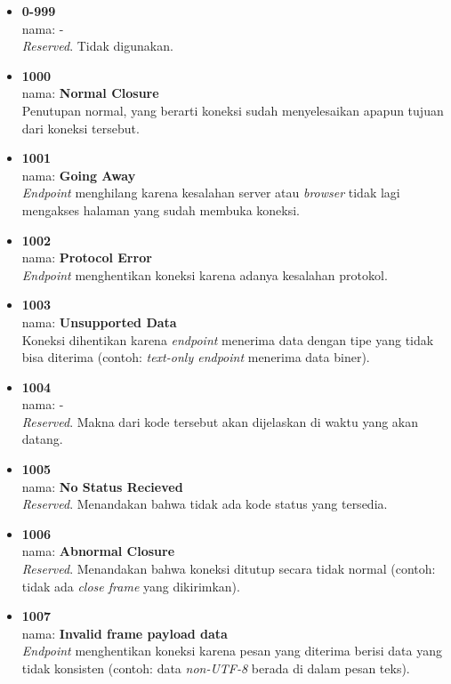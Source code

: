 \begin{itemize}
	\item \textbf{0-999} \\ nama: - \\ \textit{Reserved}. Tidak digunakan.
	
	\item \textbf{1000} \\ nama: \textbf{Normal Closure} \\ Penutupan normal, yang berarti koneksi sudah menyelesaikan apapun tujuan dari koneksi tersebut.
	
	\item \textbf{1001} \\ nama: \textbf{Going Away} \\ \textit{Endpoint} menghilang karena kesalahan server atau \textit{browser} tidak lagi mengakses halaman yang sudah membuka koneksi.
	
	\item \textbf{1002} \\ nama: \textbf{Protocol Error} \\ \textit{Endpoint} menghentikan koneksi karena adanya kesalahan protokol.
	
	\item \textbf{1003} \\ nama: \textbf{Unsupported Data} \\ Koneksi dihentikan karena \textit{endpoint} menerima data dengan tipe yang tidak bisa diterima (contoh: \textit{text-only endpoint} menerima data biner).
	
	\item \textbf{1004} \\ nama: - \\ \textit{Reserved}. Makna dari kode tersebut akan dijelaskan di waktu yang akan datang.
	
	\item \textbf{1005} \\ nama: \textbf{No Status Recieved} \\ \textit{Reserved}. Menandakan bahwa tidak ada kode status yang tersedia.
	
	\item \textbf{1006} \\ nama: \textbf{Abnormal Closure} \\ \textit{Reserved}. Menandakan bahwa koneksi ditutup secara tidak normal (contoh: tidak ada \textit{close frame} yang dikirimkan).
	
	\item \textbf{1007} \\ nama: \textbf{Invalid frame payload data} \\ \textit{Endpoint} menghentikan koneksi karena pesan yang diterima berisi data yang tidak konsisten (contoh: data \textit{non-UTF-8} berada di dalam pesan teks).
	

\end{itemize}
